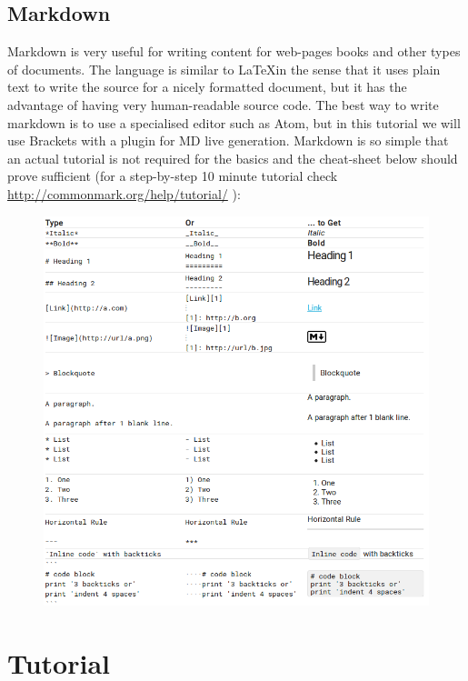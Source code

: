 \documentclass[11pt,a4paper,final]{article}
\begin{document}
\subsection{Markdown}
Markdown is very useful for writing content for web-pages books and other types of documents. The language is similar to \LaTeX in the sense that it uses plain text to write the source for a nicely formatted document, but it has the advantage of having very human-readable source code. The best way to write markdown is to use a specialised editor such as Atom, but in this tutorial we will use Brackets with a plugin for MD live generation. Markdown is so simple that an actual tutorial is not required for the basics and the cheat-sheet below should prove sufficient (for a step-by-step 10 minute tutorial check \url{http://commonmark.org/help/tutorial/} ):
\begin{figure}[!HT]
\centering
\includegraphics[scale=0.6]{MD-Tutorial.png}
\end{figure}

\section{Tutorial}
\end{document}
